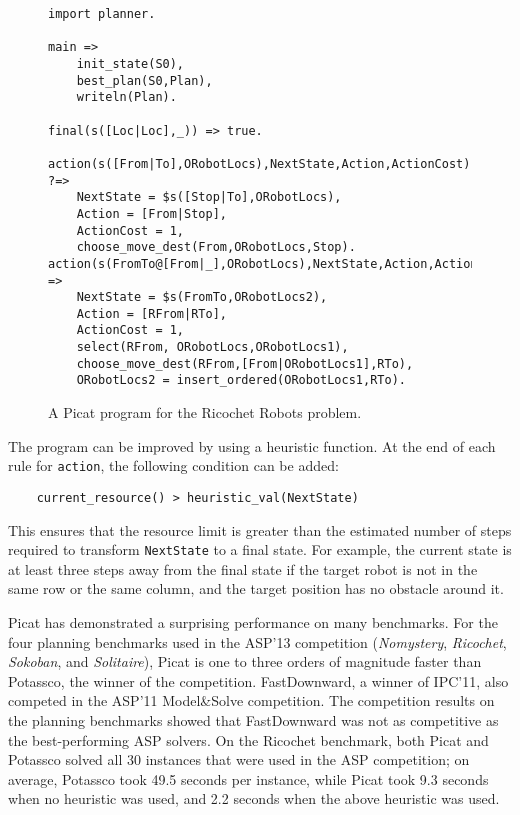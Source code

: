 \documentclass{new_tlp}
\begin{document}
\begin{figure}[tb]
\begin{center}
\begin{verbatim}
import planner.

main =>
    init_state(S0),
    best_plan(S0,Plan),
    writeln(Plan).

final(s([Loc|Loc],_)) => true.

action(s([From|To],ORobotLocs),NextState,Action,ActionCost) ?=> 
    NextState = $s([Stop|To],ORobotLocs),
    Action = [From|Stop],
    ActionCost = 1,
    choose_move_dest(From,ORobotLocs,Stop).
action(s(FromTo@[From|_],ORobotLocs),NextState,Action,ActionCost) => 
    NextState = $s(FromTo,ORobotLocs2),
    Action = [RFrom|RTo],
    ActionCost = 1,
    select(RFrom, ORobotLocs,ORobotLocs1),
    choose_move_dest(RFrom,[From|ORobotLocs1],RTo),
    ORobotLocs2 = insert_ordered(ORobotLocs1,RTo).
\end{verbatim}
\end{center}
\caption{\label{fig:ricochet}A Picat program for the Ricochet Robots problem.}
\end{figure}

The program can be improved by using a heuristic function. At the end of each rule for {\tt action}, the following condition can be added:
\begin{verbatim}
    current_resource() > heuristic_val(NextState)
\end{verbatim}
This ensures that the resource limit is greater than the estimated number of steps required to transform {\tt NextState} to a final state. For example, the current state is at least three steps away from the final state if the target robot is not in the same row or the same column, and the target position has no obstacle around it.

Picat has demonstrated a surprising performance on many benchmarks. For the four planning benchmarks used in the ASP'13 competition ({\it Nomystery}, {\it Ricochet}, {\it Sokoban}, and {\it Solitaire}), Picat is one to three orders of magnitude faster than Potassco, the winner of the competition. FastDownward, a winner of IPC'11, also competed in the ASP'11 Model\&Solve competition. The competition results on the planning benchmarks showed that FastDownward was not as competitive as the best-performing ASP solvers. On the Ricochet benchmark, both Picat and Potassco solved all 30 instances that were used in the ASP competition; on average, Potassco took 49.5 seconds per instance, while Picat took 9.3 seconds when no heuristic was used, and 2.2 seconds when the above heuristic was used. 
\end{document}
